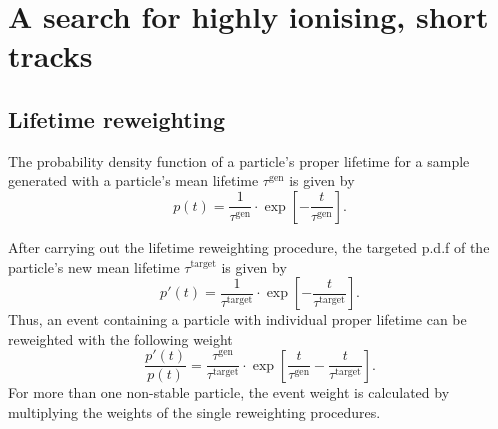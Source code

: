 \chapter{A search for highly ionising, short tracks}
\section{Lifetime reweighting}
\label{app:LifetimeReweighting}
The probability density function of a particle's proper lifetime for a sample generated with a particle's mean lifetime $\tau^{\text{gen}}$ is given by
\begin{equation*}
p \left( t \right) = \frac{1}{\tau^{\text{gen}}} \cdot \exp\left[ -\frac{t}{\tau^{\text{gen}}} \right].
\end{equation*}

After carrying out the lifetime reweighting procedure, the targeted p.d.f of the particle's new mean lifetime $\tau^{\text{target}}$ is given by
\begin{equation*}
p'  \left( t \right) = \frac{1}{\tau^{\text{target}}} \cdot \exp\left[ -\frac{t}{\tau^{\text{target}}} \right].
\end{equation*}
Thus, an event containing a particle with individual proper lifetime can be reweighted with the following weight
\begin{equation*}
\label{eq:reweight}
\frac{p'  \left( t \right)}{p \left( t \right)} = \frac{\tau^{\text{gen}}}{\tau^{\text{target}}} \cdot \exp\left[ \frac{t}{\tau^{\text{gen}}} - \frac{t}{\tau^{\text{target}}} \right].  %
\end{equation*}
For more than one non-stable particle, the event weight is calculated by multiplying the weights of the single reweighting procedures.

\clearpage
